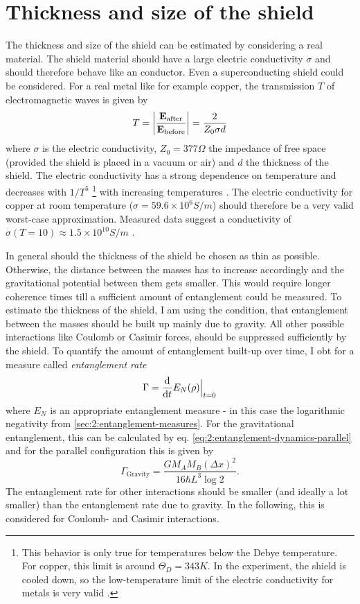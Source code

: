 \section{Thickness and size of the shield}
The thickness and size of the shield can be estimated by considering a real material. The shield material should have a large electric conductivity $\sigma$ and should therefore behave like an conductor. Even a superconducting shield could be considered.
For a real metal like for example copper, the transmission $T$ of electromagnetic waves is given by \cite{Vandenbosch_2022}
\begin{equation}
  T = \abs{\frac{\vec{E}_\mathrm{after}}{\vec{E}_\mathrm{before}}} = \frac{2}{Z_0 \sigma d}
\end{equation}
where $\sigma$ is the electric conductivity, $Z_0 = 377\si{\Omega}$ the impedance of free space (provided the shield is placed in a vacuum or air) and $d$ the thickness of the shield.
The electric conductivity has a strong dependence on temperature and decreases with $1/T^5$ \footnote{This behavior is only true for temperatures below the Debye temperature. For copper, this limit is around $\Theta_D = 343\si{K}$. In the experiment, the shield is cooled down, so the low-temperature limit of the electric conductivity for metals is very valid \cite{Berman_1952}.} with increasing temperatures \cite[p. 284-286]{Gross_2018}. The electric conductivity for copper at room temperature ($\sigma = 59.6\times 10^6 \si{S/m}$) should therefore be a very valid worst-case approximation. 
Measured data suggest a conductivity of $\sigma(T = 10) \approx 1.5\times 10^{10}\si{S/m}$ \cite{Berman_1952}.

In general should the thickness of the shield be chosen as thin as possible. Otherwise, the distance between the masses has to increase accordingly and the gravitational potential between them gets smaller. This would require longer coherence times till a sufficient amount of entanglement could be measured.
To estimate the thickness of the shield, I am using the condition, that entanglement between the masses should be built up mainly due to gravity. All other possible interactions like Coulomb or Casimir forces, should be suppressed sufficiently by the shield.
To quantify the amount of entanglement built-up over time, I obt for a measure called \emph{entanglement rate}
\begin{equation}\label{eq:5:entanglement-rate}
  \Gamma = \dv{t} E_N(\rho)\Big|_{t=0}
\end{equation} 
where $E_N$ is an appropriate entanglement measure - in this case the logarithmic negativity from \cref{sec:2:entanglement-measures}.
For the gravitational entanglement, this can be calculated by eq. \eqref{eq:2:entanglement-dynamics-parallel} and for the parallel configuration this is given by
\begin{equation}\label{eq:5:entanglement-rate-gravity}
  \Gamma_\mathrm{Gravity} = \frac{G M_A M_B (\Delta x)^2}{16 \hbar L^3 \log 2} .
\end{equation}
The entanglement rate for other interactions should be smaller (and ideally a lot smaller) than the entanglement rate due to gravity.
In the following, this is considered for Coulomb- and Casimir interactions.

